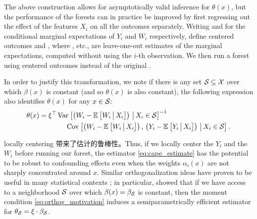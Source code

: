 \documentclass[aos]{imsart}
\theoremstyle{plain}
\theoremstyle{definition}
\theoremstyle{remark}
\begin{document}
\begin{CJK}{UTF8}{gbsn}
The above construction allows for asymptotically valid inference for $\theta(x)$,
but the performance of the forests can in practice
be improved by first regressing out the effect of the features $X_i$ on all the
outcomes separately. Writing
 and 
for the conditional marginal expectations of $Y_i$ and $W_i$ respectively,
define centered outcomes
 and ,
where , etc., are leave-one-out estimates of the marginal expectations,
computed without using the $i$-th observation.
We then run a forest using centered outcomes
 instead of the original
.

In order to justify this transformation, we note if there is any set $\mathcal{S} \subseteq \mathcal{X}$
over which $\beta(x)$ is constant (and so $\theta(x)$ is also constant), the following expression
also identifies $\theta(x)$ for any $x \in \mathcal{S}$:
\begin{equation}
\label{eq:orthog_motivation}
\begin{split}
\theta(x) = \xi^\top &\Var{\p{W_i - \EE{W_i \cond X_i}} \cond X_i \in \set}^{-1} \\
& \ \ \ \ \Cov{\p{W_i - \EE{W_i \cond X_i}}, \, \p{Y_i - \EE{Y_i \cond X_i}} \cond X_i \in \set}.
\end{split}
\end{equation}

locally centering 带来了估计的鲁棒性。Thus, if we locally center the $Y_i$ and the $W_i$ before running our forest, the estimator
\eqref{eq:cape_estimate} has the potential to be robust to confounding effects
even when the weights $\alpha_i(x)$ are not sharply concentrated around $x$.
Similar orthogonalization ideas have proven to be useful in many statistical contexts
\citep[e.g.,][]{chernozhukov2016double,newey1994asymptotic,neyman1979c};
in particular, \citet{robinson1988root} showed that if we have access to a neighborhood $\mathcal{S}$
over which $\beta(x) = \beta_{\mathcal{S}}$ is constant, then the moment condition \eqref{eq:orthog_motivation}
induces a semiparametrically efficient estimator for $\theta_{\mathcal{S}} = \xi \cdot \beta_{\mathcal{S}}$.


\end{CJK}
\end{document}
